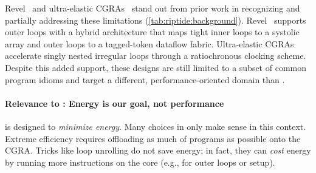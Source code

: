 
Revel~\cite{weng2020hybrid} and ultra-elastic CGRAs~\cite{torng2021ultra} stand out from prior work in recognizing and partially addressing these limitations (\autoref{tab:riptide:background}).
% 
Revel~\cite{weng2020hybrid} supports outer loops with a hybrid architecture that maps tight inner loops to a systolic array and outer loops to a tagged-token dataflow fabric.
% 
Ultra-elastic CGRAs~\cite{torng2021ultra} accelerate singly nested irregular loops through a ratiochronous clocking scheme.
% 
Despite this added support, these designs are still limited to a subset of common program idioms and target a different, performance-oriented domain than \riptide.
% 
% 



\paragraph{Relevance to \riptide: Energy is our goal, not performance}
%
\riptide is designed to \emph{minimize energy}.
%
Many choices in \riptide only make sense in this context.
%
Extreme efficiency requires offloading as much of programs as possible onto the CGRA.
% 
%
Tricks like loop unrolling do not save energy; in fact, they
can \emph{cost} energy by running more instructions on the core
(e.g., for outer loops or setup).
%

